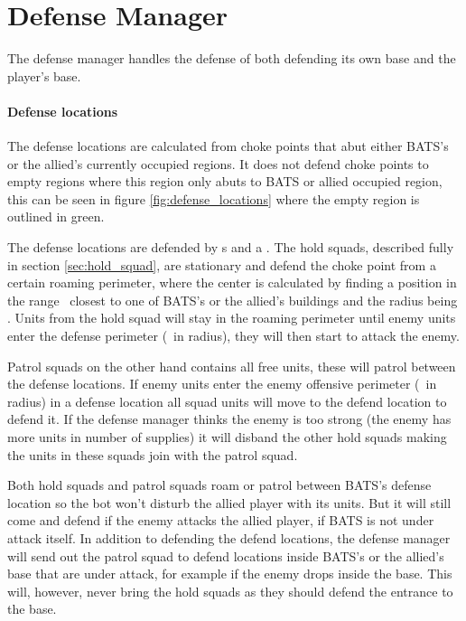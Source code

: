 \section{Defense Manager}
\label{sec:defense_manager}
The defense manager handles the defense of both defending its own base and the player’s base. 



\paragraph{Defense locations}
The defense locations are calculated from choke points that abut either BATS’s or the allied’s currently occupied regions. It does not defend choke points to empty regions where this region only abuts to BATS or allied occupied region, this can be seen in figure \ref{fig:defense_locations} where the empty region is outlined in green.

The defense locations are defended by s and a . The hold squads, described fully in section \ref{sec:hold_squad}, are stationary and defend the choke point from a certain roaming perimeter, where the center is calculated by finding a position in the range \squadDefendRoamDistanceMinMax~closest to one of BATS’s or the allied’s buildings and the radius being \squadDefendRoamPerimeter. Units from the hold squad will stay in the roaming perimeter until enemy units enter the defense perimeter (\squadDefendDefendPerimeter~in radius), they will then start to attack the enemy. 

Patrol squads on the other hand contains all free units, these will patrol between the defense locations. If enemy units enter the enemy offensive perimeter (\squadDefendEnemyOffensivePerimeter~in radius) in a defense location all squad units will move to the defend location to defend it. If the defense manager thinks the enemy is too strong (the enemy has more units in number of supplies) it will disband the other hold squads making the units in these squads join with the patrol squad.

Both hold squads and patrol squads roam or patrol between BATS’s defense location so the bot won’t disturb the allied player with its units. But it will still come and defend if the enemy attacks the allied player, if BATS is not under attack itself. In addition to defending the defend locations, the defense manager will send out the patrol squad to defend locations inside BATS’s or the allied’s base that are under attack, for example if the enemy drops inside the base. This will, however, never bring the hold squads as they should defend the entrance to the base.

